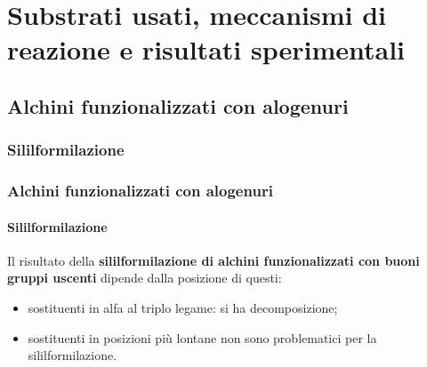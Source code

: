\section{Substrati usati, meccanismi di reazione e risultati sperimentali}

\subsection{Alchini funzionalizzati con alogenuri}
\subsubsection{Sililformilazione}\begin{frame}\frametitle{Alchini funzionalizzati con alogenuri}\framesubtitle{Sililformilazione}
Il risultato della {\bf sililformilazione di alchini funzionalizzati con buoni gruppi uscenti} dipende dalla posizione di questi:
\begin{itemize}
 \item sostituenti in alfa al triplo legame: si ha decomposizione; 
 \item sostituenti in posizioni più lontane non sono problematici per la sililformilazione.
\end{itemize}


\end{frame}

\logo{}
